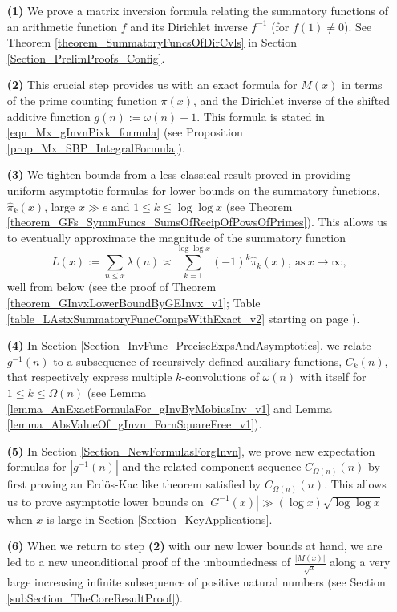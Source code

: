 \documentclass[11pt,reqno,a4letter]{article}
\numberwithin{figure}{section}
\numberwithin{table}{section}
\theoremstyle{plain}
\numberwithin{theorem}{section}
\theoremstyle{definition}
\begin{document}
\begin{itemize} 

\item[\textbf{(1)}] We prove a matrix inversion formula relating the summatory 
           functions of an arithmetic function $f$ and its Dirichlet inverse $f^{-1}$ (for $f(1) \neq 0$). 
           See Theorem \ref{theorem_SummatoryFuncsOfDirCvls} in 
           Section \ref{Section_PrelimProofs_Config}.  
\item[\textbf{(2)}] This crucial step provides us with an exact formula for $M(x)$ in terms of 
           the prime counting function $\pi(x)$, and the 
           Dirichlet inverse of the shifted additive function $g(n) := \omega(n) + 1$. This 
           formula is stated in \eqref{eqn_Mx_gInvnPixk_formula} 
           (see Proposition \ref{prop_Mx_SBP_IntegralFormula}). 
\item[\textbf{(3)}] We tighten bounds from a less classical result proved in 
            \cite[\S 7]{MV} providing uniform asymptotic formulas for lower bounds on the  
           summatory functions, $\widehat{\pi}_k(x)$, large $x \gg e$ and 
           $1 \leq k \leq \log\log x$ 
           (see Theorem \ref{theorem_GFs_SymmFuncs_SumsOfRecipOfPowsOfPrimes}). 
           This allows us to eventually approximate the magnitude of the summatory function 
           \[
           L(x) := \sum_{n \leq x} \lambda(n) \asymp 
                \sum_{k=1}^{\log\log x} (-1)^k \widehat{\pi}_k(x), 
                \mathrm{\ as\ } x \rightarrow \infty, 
           \]
           well from below (see the proof of 
           Theorem \ref{theorem_GInvxLowerBoundByGEInvx_v1}; 
           Table \ref{table_LAstxSummatoryFuncCompsWithExact_v2} starting on page 
           \pageref{table_LAstxSummatoryFuncCompsWithExact_v2}). 
\item[\textbf{(4)}] In 
           Section \ref{Section_InvFunc_PreciseExpsAndAsymptotics}. 
           we relate $g^{-1}(n)$ to a subsequence of recursively-defined auxiliary functions, $C_k(n)$, 
           that respectively express multiple $k$-convolutions of $\omega(n)$ with itself for 
           $1 \leq k \leq \Omega(n)$ 
           (see Lemma \ref{lemma_AnExactFormulaFor_gInvByMobiusInv_v1} and 
           Lemma \ref{lemma_AbsValueOf_gInvn_FornSquareFree_v1}). 
\item[\textbf{(5)}] In Section \ref{Section_NewFormulasForgInvn}, 
           we prove new expectation formulas for $|g^{-1}(n)|$ and the related component sequence 
           $C_{\Omega(n)}(n)$ by first proving an Erd\"os-Kac like theorem satisfied by $C_{\Omega(n)}(n)$. 
           This allows us to prove asymptotic lower bounds on 
           $|G^{-1}(x)| \gg (\log x) \sqrt{\log\log x}$ when $x$ is large in 
           Section \ref{Section_KeyApplications}. 
\item[\textbf{(6)}] When we return to step \textbf{(2)} 
           with our new lower bounds at hand, we are led to a new unconditional proof of the 
           unboundedness of $\frac{|M(x)|}{\sqrt{x}}$ 
           along a very large increasing infinite subsequence of positive natural numbers 
           (see Section \ref{subSection_TheCoreResultProof}). 
           
\end{itemize} 
\end{document}
